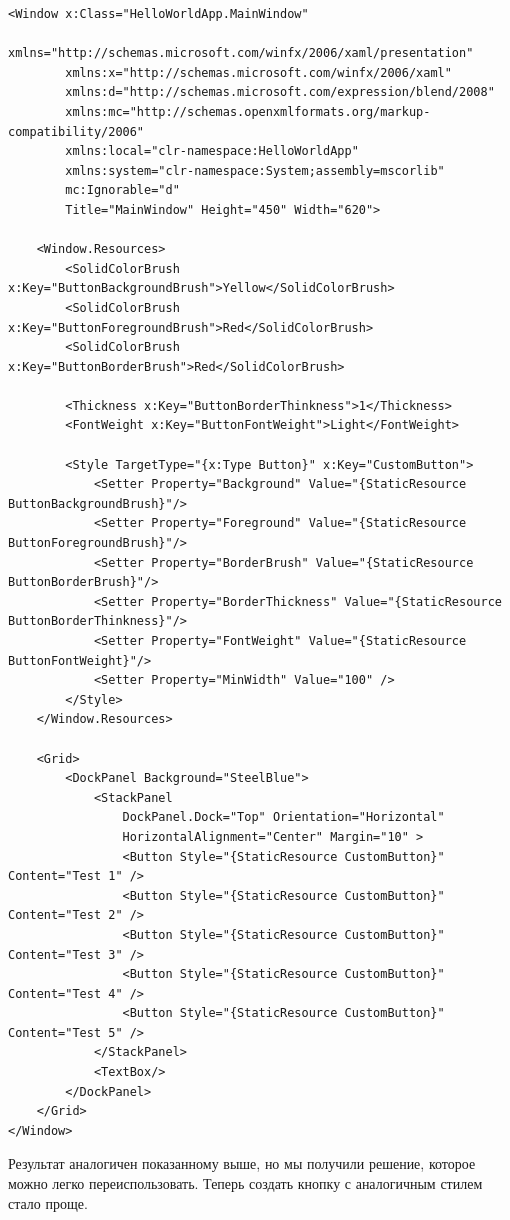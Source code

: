 \begin{verbatim}
<Window x:Class="HelloWorldApp.MainWindow"
        xmlns="http://schemas.microsoft.com/winfx/2006/xaml/presentation"
        xmlns:x="http://schemas.microsoft.com/winfx/2006/xaml"
        xmlns:d="http://schemas.microsoft.com/expression/blend/2008"
        xmlns:mc="http://schemas.openxmlformats.org/markup-compatibility/2006"
        xmlns:local="clr-namespace:HelloWorldApp"
        xmlns:system="clr-namespace:System;assembly=mscorlib"
        mc:Ignorable="d"
        Title="MainWindow" Height="450" Width="620">

    <Window.Resources>
        <SolidColorBrush x:Key="ButtonBackgroundBrush">Yellow</SolidColorBrush>
        <SolidColorBrush x:Key="ButtonForegroundBrush">Red</SolidColorBrush>
        <SolidColorBrush x:Key="ButtonBorderBrush">Red</SolidColorBrush>

        <Thickness x:Key="ButtonBorderThinkness">1</Thickness>
        <FontWeight x:Key="ButtonFontWeight">Light</FontWeight>

        <Style TargetType="{x:Type Button}" x:Key="CustomButton">
            <Setter Property="Background" Value="{StaticResource ButtonBackgroundBrush}"/>
            <Setter Property="Foreground" Value="{StaticResource ButtonForegroundBrush}"/>
            <Setter Property="BorderBrush" Value="{StaticResource ButtonBorderBrush}"/>
            <Setter Property="BorderThickness" Value="{StaticResource ButtonBorderThinkness}"/>
            <Setter Property="FontWeight" Value="{StaticResource ButtonFontWeight}"/>
            <Setter Property="MinWidth" Value="100" />
        </Style>
    </Window.Resources>
    
    <Grid>
        <DockPanel Background="SteelBlue">
            <StackPanel 
                DockPanel.Dock="Top" Orientation="Horizontal" 
                HorizontalAlignment="Center" Margin="10" >
                <Button Style="{StaticResource CustomButton}" Content="Test 1" />
                <Button Style="{StaticResource CustomButton}" Content="Test 2" />
                <Button Style="{StaticResource CustomButton}" Content="Test 3" />
                <Button Style="{StaticResource CustomButton}" Content="Test 4" />
                <Button Style="{StaticResource CustomButton}" Content="Test 5" />
            </StackPanel>
            <TextBox/>
        </DockPanel>
    </Grid>
</Window>
\end{verbatim}

Результат аналогичен показанному выше, но мы получили решение, которое можно легко переиспользовать. Теперь создать кнопку с аналогичным стилем стало проще.


